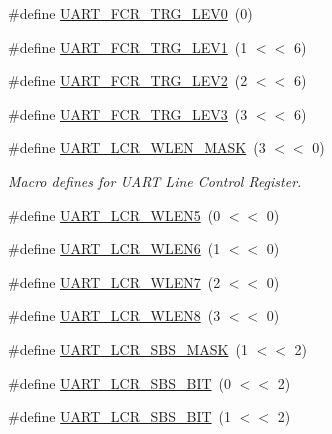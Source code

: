 \begin{DoxyCompactItemize}
\item 
\#define \hyperlink{group__UART__17XX__40XX_gaba4b4e15936a075bf5054776fbd59676}{U\-A\-R\-T\-\_\-\-F\-C\-R\-\_\-\-T\-R\-G\-\_\-\-L\-E\-V0}~(0)
\item 
\#define \hyperlink{group__UART__17XX__40XX_ga264238c2dde9248a73d679c32a74004b}{U\-A\-R\-T\-\_\-\-F\-C\-R\-\_\-\-T\-R\-G\-\_\-\-L\-E\-V1}~(1 $<$$<$ 6)
\item 
\#define \hyperlink{group__UART__17XX__40XX_ga7b655aba90b695210e7ce9f7b00cea89}{U\-A\-R\-T\-\_\-\-F\-C\-R\-\_\-\-T\-R\-G\-\_\-\-L\-E\-V2}~(2 $<$$<$ 6)
\item 
\#define \hyperlink{group__UART__17XX__40XX_ga9e6ef12c7a1f3514d6e30d7548ed3e46}{U\-A\-R\-T\-\_\-\-F\-C\-R\-\_\-\-T\-R\-G\-\_\-\-L\-E\-V3}~(3 $<$$<$ 6)
\item 
\#define \hyperlink{group__UART__17XX__40XX_ga0d00b51fd6ca0b80b89af4044d94bbc0}{U\-A\-R\-T\-\_\-\-L\-C\-R\-\_\-\-W\-L\-E\-N\-\_\-\-M\-A\-S\-K}~(3 $<$$<$ 0)
\begin{DoxyCompactList}\small\item\em Macro defines for U\-A\-R\-T Line Control Register. \end{DoxyCompactList}\item 
\#define \hyperlink{group__UART__17XX__40XX_ga2c64fd92092b8ac1e64b6b1204927682}{U\-A\-R\-T\-\_\-\-L\-C\-R\-\_\-\-W\-L\-E\-N5}~(0 $<$$<$ 0)
\item 
\#define \hyperlink{group__UART__17XX__40XX_ga916fcefe6db8651be1cb1c066726381d}{U\-A\-R\-T\-\_\-\-L\-C\-R\-\_\-\-W\-L\-E\-N6}~(1 $<$$<$ 0)
\item 
\#define \hyperlink{group__UART__17XX__40XX_ga7746eb5a2aac4b9f86e97ee82e5e2a10}{U\-A\-R\-T\-\_\-\-L\-C\-R\-\_\-\-W\-L\-E\-N7}~(2 $<$$<$ 0)
\item 
\#define \hyperlink{group__UART__17XX__40XX_ga71ecde192fb0c9facb9ef9c6b77cc687}{U\-A\-R\-T\-\_\-\-L\-C\-R\-\_\-\-W\-L\-E\-N8}~(3 $<$$<$ 0)
\item 
\#define \hyperlink{group__UART__17XX__40XX_ga99a703d7a010edb3c940b54537ccdb08}{U\-A\-R\-T\-\_\-\-L\-C\-R\-\_\-\-S\-B\-S\-\_\-\-M\-A\-S\-K}~(1 $<$$<$ 2)
\item 
\#define \hyperlink{group__UART__17XX__40XX_ga70ccdedb76a079b8e7c87e5c3709469c}{U\-A\-R\-T\-\_\-\-L\-C\-R\-\_\-\-S\-B\-S\-\_\-B\-I\-T}~(0 $<$$<$ 2)
\item 
\#define \hyperlink{group__UART__17XX__40XX_ga6d36ad770b49b2354ed5cefbc066b7e2}{U\-A\-R\-T\-\_\-\-L\-C\-R\-\_\-\-S\-B\-S\-\_\-B\-I\-T}~(1 $<$$<$ 2)
\item 
$$
\end{DoxyCompactItemize}
